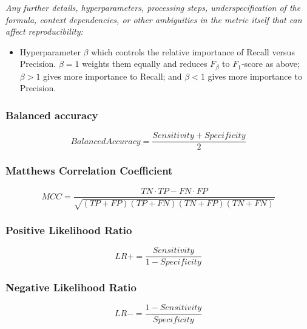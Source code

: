 \documentclass[a4paper,11pt]{article}
\begin{document}
\textit{Any further details, hyperparameters, processing steps, underspecification of the formula, context dependencies, or other ambiguities in the metric itself that can affect reproducibility:}

\begin{itemize}
    \item Hyperparameter $\beta$ which controls the relative importance of Recall versus Precision. $\beta=1$ weights them equally and reduces $F_\beta$ to $F_1$-score as above; $\beta>1$ gives more importance to Recall; and $\beta < 1$ gives more importance to Precision.
\end{itemize}

\subsubsection{Balanced accuracy}\label{formula:balanced_accuracy}

\begin{equation}
    BalancedAccuracy = \frac{Sensitivity + Specificity}{2}
\end{equation}

\subsubsection{Matthews Correlation Coefficient}\label{formula:mcc}

\begin{equation}
    MCC = \frac{TN \cdot TP - FN \cdot FP}{\sqrt{(TP+FP) (TP+FN) (TN+FP) (TN+FN)}}
\end{equation}

\subsubsection{Positive Likelihood Ratio}\label{formula:lr+}

\begin{equation}
    LR+ = \frac{Sensitivity}{1 - Specificity}
\end{equation}

\subsubsection{Negative Likelihood Ratio}\label{formula:lr-}

\begin{equation}
    LR- = \frac{1 - Sensitivity}{Specificity}
\end{equation}
\end{document}
